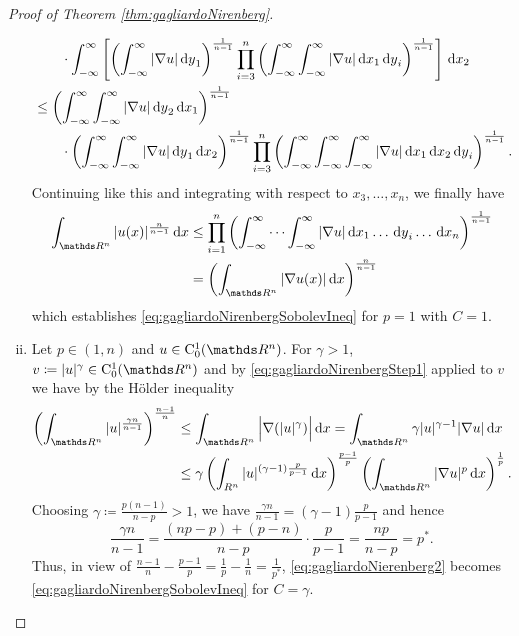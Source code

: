\begin{proof}[Proof of Theorem \ref{thm:gagliardoNirenberg}]
\begin{enumerate}[i)]
\begin{align*}
        &\quad\quad \cdot \int_{-\infty}^\infty  \left[ \left( \int_{-\infty}^\infty |\nabla u| \d y_1 \right)^{\frac{1}{n - 1}} \prod_{i = 3}^n \left( \int_{-\infty}^\infty \int_{-\infty}^\infty  |\nabla u| \d x_1 \d y_i \right)^{\frac{1}{n - 1}} \right] \d x_2 \\
        &\leq \left( \int_{-\infty}^\infty \int_{-\infty}^\infty |\nabla u| \d y_2 \d x_1 \right)^{\frac{1}{n - 1}} \\
        &\quad\quad \cdot \left( \int_{-\infty}^\infty \int_{-\infty}^\infty | \nabla u| \d y_1 \d x_2 \right)^{\frac{1}{n - 1}} \prod_{i = 3}^n \left( \int_{-\infty}^\infty \int_{-\infty}^\infty \int_{-\infty}^\infty |\nabla u| \d x_1 \d x_2 \d y_i  \right)^{\frac{1}{n - 1}}.
      \end{align*}
      Continuing like this and integrating with respect to $x_3,\dots,x_n$, we finally have
      \begin{align}
        \label{eq:gagliardoNirenbergStep1}
        \int_{\R^n} |u(x)|^{\frac{n}{n - 1}} \d x
        &\leq \prod_{i = 1}^n \left( \int_{-\infty}^\infty \cdots \int_{-\infty}^\infty |\nabla u| \d x_1 \dots \d y_i  \dots \d x_n \right)^{\frac{1}{n - 1}} \\
        &= \left( \int_{\R^n} |\nabla u(x)| \d x \right)^{\frac{n}{n - 1}}\nonumber
      \end{align}
      which establishes \eqref{eq:gagliardoNirenbergSobolevIneq} for $p = 1$ with $C = 1$.

    \item Let $p \in (1,n)$ and $u \in \CC_0^1(\R^n)$.
      For $\gamma > 1$, $v \coloneqq |u|^\gamma \in \CC_0^1(\R^n)$ and by \eqref{eq:gagliardoNirenbergStep1} applied to $v$ we have by the Hölder inequality
      \begin{align}
        \label{eq:gagliardoNierenberg2}
        \left(\int_{\R^n} |u|^{\frac{\gamma n}{n - 1}} \right)^{\frac{n - 1}{n}}
        &\leq \int_{\R^n} \Big| \nabla (|u|^\gamma) \Big| \d x 
        = \int_{\R^n} \gamma | u|^{\gamma - 1} | \nabla u| \d x \\ 
        &\leq \gamma \left(\int_{R^n} |u|^{(\gamma - 1) \frac{p}{p - 1}} \d x \right)^{\frac{p - 1}{p}} \left( \int_{\R^n} | \nabla u|^p \d x \right)^{\frac{1}{p}}. \nonumber
      \end{align}
      Choosing $\gamma \coloneqq \frac{p (n - 1)}{n - p} > 1$, we have $\frac{\gamma n}{n - 1} = (\gamma - 1)\frac{p}{p - 1}$ and hence
      $$
      \frac{\gamma n}{n - 1} = \frac{(np - p) + (p - n)}{n - p} \cdot \frac{p }{p - 1} = \frac{n p }{n - p} = p^*.
      $$
      Thus, in view of $\frac{n - 1}{n} - \frac{p - 1}{p} = \frac{1}{p} - \frac{1}{n} = \frac{1}{p^*}$, \eqref{eq:gagliardoNierenberg2} becomes \eqref{eq:gagliardoNirenbergSobolevIneq} for $C = \gamma$.


\end{enumerate}
\end{proof}
